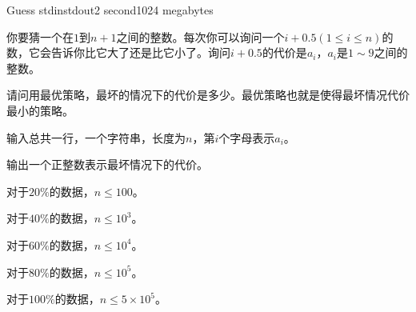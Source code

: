 \begin{problem}{Guess}
{stdin}{stdout}{2 second}{1024 megabytes}

你要猜一个在$1$到$n+1$之间的整数。每次你可以询问一个$i+0.5(1 \leq i\leq n)$的数，它会告诉你比它大了还是比它小了。询问$i+0.5$的代价是$a_i$，$a_i$是$1\sim 9$之间的整数。

请问用最优策略，最坏的情况下的代价是多少。最优策略也就是使得最坏情况代价最小的策略。

\Input

输入总共一行，一个字符串，长度为$n$，第$i$个字母表示$a_i$。

\Output

输出一个正整数表示最坏情况下的代价。
\Example
\begin{example}
\end{example}

\Constraints

对于$20\%$的数据，$n\leq 100$。

对于$40\%$的数据，$n\leq 10^3$。

对于$60\%$的数据，$n\leq 10^4$。

对于$80\%$的数据，$n\leq 10^5$。

对于$100\%$的数据，$n\leq 5 \times 10^5$。

\end{problem}